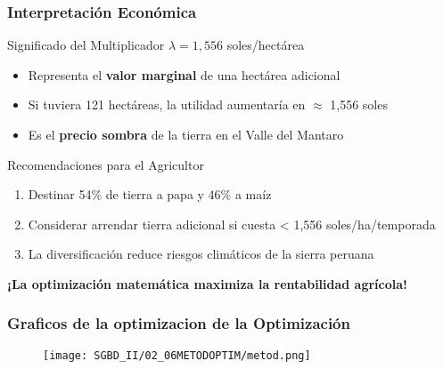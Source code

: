 \documentclass{beamer}
\begin{document}
\begin{frame}
\frametitle{Interpretación Económica}

\begin{block}{Significado del Multiplicador $\lambda = 1,556$ soles/hectárea}
\begin{itemize}
\item Representa el \textbf{valor marginal} de una hectárea adicional
\item Si tuviera 121 hectáreas, la utilidad aumentaría en $\approx$ 1,556 soles
\item Es el \textbf{precio sombra} de la tierra en el Valle del Mantaro
\end{itemize}
\end{block}

\begin{block}{Recomendaciones para el Agricultor}
\begin{enumerate}
\item Destinar 54\% de tierra a papa y 46\% a maíz
\item Considerar arrendar tierra adicional si cuesta < 1,556 soles/ha/temporada
\item La diversificación reduce riesgos climáticos de la sierra peruana
\end{enumerate}
\end{block}

\begin{center}
\textbf{¡La optimización matemática maximiza la rentabilidad agrícola!}
\end{center}

\end{frame}
\begin{frame}
\frametitle{Graficos de la optimizacion de la Optimización}
\begin{figure}[h]
\centering
\texttt{[image: SGBD\_II/02\_06METODOPTIM/metod.png]}
\end{figure}
\end{frame}
\end{document}

